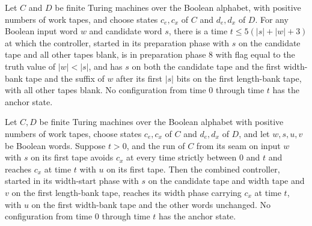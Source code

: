 \begin{lemma}
\label{Turing.FinTM.emitterP2_body_prepare}
\leanok
{}
Let $C$ and $D$ be finite Turing machines over the Boolean alphabet, with positive
numbers of work tapes, and choose states $c_e,c_x$ of $C$ and $d_e,d_x$ of $D$. For any
Boolean input word $w$ and candidate word $s$, there is a time $t\le 5(|s|+|w|+3)$ at
which the controller, started in its preparation phase with $s$ on the candidate tape
and all other tapes blank, is in preparation phase $8$ with flag equal to the truth
value of $|w|<|s|$, and has $s$ on both the candidate tape and the first width-bank tape
and the suffix of $w$ after its first $|s|$ bits on the first length-bank tape, with all
other tapes blank. No configuration from time $0$ through time $t$ has the anchor state.
\end{lemma}

\begin{lemma}
\label{Turing.FinTM.emitterP2_body_width}
\leanok
{}
Let $C,D$ be finite Turing machines over the Boolean alphabet with positive numbers of
work tapes, choose states $c_e,c_x$ of $C$ and $d_e,d_x$ of $D$, and let $w,s,u,v$ be
Boolean words. Suppose $t>0$, and the run of $C$ from its seam on input $w$ with $s$ on
its first tape avoids $c_x$ at every time strictly between $0$ and $t$ and reaches $c_x$
at time $t$ with $u$ on its first tape. Then the combined controller, started in its
width-start phase with $s$ on the candidate tape and width tape and $v$ on the first
length-bank tape, reaches its width phase carrying $c_x$ at time $t$, with $u$ on the
first width-bank tape and the other words unchanged. No configuration from time $0$
through time $t$ has the anchor state.
\end{lemma}

